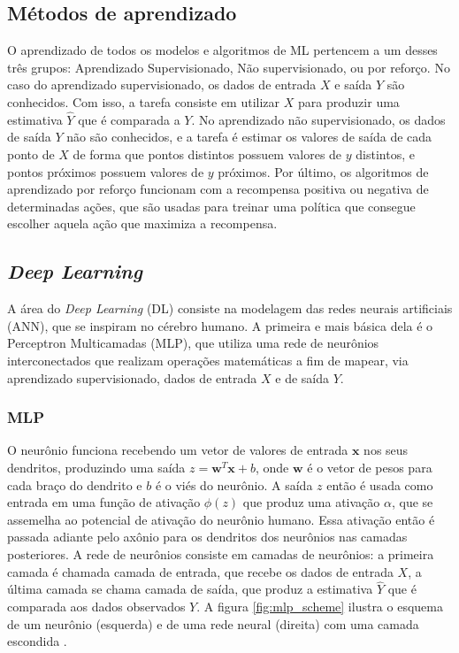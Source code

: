 \subsection{Métodos de aprendizado}
O aprendizado de todos os modelos e algoritmos de ML pertencem a um desses três grupos: Aprendizado Supervisionado, Não supervisionado, ou por reforço.  No caso do aprendizado supervisionado, os dados de entrada $X$ e saída $Y$ são conhecidos. Com isso, a tarefa consiste em utilizar $X$ para produzir uma estimativa $\hat{Y}$ que é comparada a $Y$. No aprendizado não supervisionado, os dados de saída $Y$ não são conhecidos, e a tarefa é estimar os valores de saída de cada ponto de $X$ de forma que pontos distintos possuem valores de $y$ distintos, e pontos próximos possuem valores de $y$ próximos. Por último, os algoritmos de aprendizado por reforço funcionam com a recompensa positiva ou negativa de determinadas ações, que são usadas para treinar uma política que consegue escolher aquela ação que maximiza a recompensa. 

\subsection{\textit{Deep Learning}}
A área do \textit{Deep Learning} (DL) consiste na modelagem das redes neurais artificiais (ANN), que se inspiram no cérebro humano. A primeira e mais básica dela é o Perceptron Multicamadas (MLP), que utiliza uma rede de neurônios interconectados que realizam operações matemáticas a fim de mapear, via aprendizado supervisionado, dados de entrada $X$ e de saída $Y$. 

\subsubsection{MLP}
O neurônio funciona recebendo um vetor de valores de entrada $\mathbf{x}$ nos seus dendritos, produzindo uma saída $z = \mathbf{w}^T\mathbf{x} + b$, onde $\mathbf{w}$ é o vetor de pesos para cada braço do dendrito e $b$ é o viés do neurônio. A saída $z$ então é usada como entrada em uma função de ativação $\phi(z)$ que produz uma ativação $\alpha$, que se assemelha ao potencial de ativação do neurônio humano. Essa ativação então é passada adiante pelo axônio para os dendritos dos neurônios nas camadas posteriores. A rede de neurônios consiste em camadas de neurônios: a primeira camada é chamada  camada de entrada, que recebe os dados de entrada $X$, a última camada se chama camada de saída, que produz a estimativa $\hat{Y}$ que é comparada aos dados observados $Y$. A figura \ref{fig:mlp_scheme} ilustra o esquema de um neurônio (esquerda) e de uma rede neural (direita) com uma camada escondida \cite{alpaydin2020introduction}.

